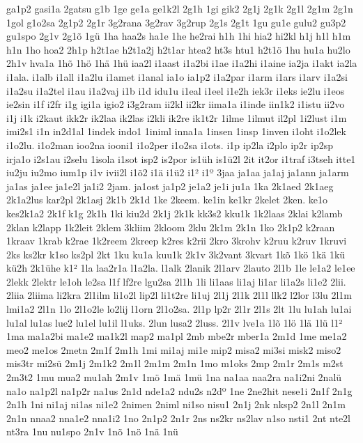 {ga1p2
gasi1a
2gatsu
g1b
1ge
ge1a
ge1k2l
2g1h
1gi
gik2
2g1j
2g1k
2g1l
2g1m
2g1n
1gol
g1o2sa
2g1p2
2g1r
3g2rana
3g2rav
3g2rup
2g1s
2g1t
1gu
gu1e
gulu2
gu3p2
gu1spo
2g1v
2g1^^f5
1g^^fc
1ha
haa2s
ha1e
1he
he2rai
h1h
1hi
hia2
hi2kl
h1j
h1l
h1m
h1n
1ho
hoa2
2h1p
h2t1ae
h2t1a2j
h2t1ar
htea2
ht3s
htu1
h2t1^^f6
1hu
hu1a
hu2lo
2h1v
hva1a
1h^^f5
1h^^f6
1h^^e4
1h^^fc
iaa2l
i1aast
i1a2bi
i1ae
i1a2hi
i1aine
ia2ja
i1akt
ia2la
i1ala.
i1alb
i1all
i1a2lu
i1amet
i1anal
ia1o
ia1p2
i1a2par
i1arm
i1ars
i1arv
i1a2si
i1a2su
i1a2tel
i1au
i1a2vaj
i1b
i1d
idu1u
i1eal
i1eel
i1e2h
iek3r
i1eks
ie2lu
i1eos
ie2sin
i1f
i2fr
i1g
igi1a
igio2
i3g2ram
ii2kl
ii2kr
iima1a
i1inde
iin1k2
i1istu
ii2vo
i1j
i1k
i2kaut
ikk2r
ik2laa
ik2las
i2kli
ik2re
ik1t2r
1ilme
1ilmut
il2pl
1i2lust
i1m
imi2s1
i1n
in2d1al
1indek
indo1
1iniml
inna1a
1insen
1insp
1inven
i1oht
i1o2lek
i1o2lu.
i1o2man
ioo2na
iooni1
i1o2per
i1o2sa
i1ots.
i1p
ip2la
i2plo
ip2r
ip2sp
irja1o
i2s1au
i2selu
1isola
i1sot
isp2
is2por
is1^^fch
is1^^fc2l
2it
it2or
i1traf
i3tseh
itte1
iu2ju
iu2mo
ium1p
i1v
ivii2l
i1^^f52
i1^^e4
i1^^fc2
i1^^b2
i1^^ba
3jaa
ja1aa
ja1aj
ja1ann
ja1arm
ja1as
ja1ee
ja1e2l
ja1i2
2jam.
ja1ost
ja1p2
je1a2
je1i
ju1a
1ka
2k1aed
2k1aeg
2k1a2lus
kar2pl
2k1asj
2k1b
2k1d
1ke
2keem.
ke1in
ke1kr
2kelet
2ken.
ke1o
kes2k1a2
2k1f
k1g
2k1h
1ki
kiu2d
2k1j
2k1k
kk3s2
kku1k
1k2laas
2klai
k2lamb
2klan
k2lapp
1k2leit
2klem
3kliim
2kloom
2klu
2k1m
2k1n
1ko
2k1p2
k2raan
1kraav
1krab
k2rae
1k2reem
2kreep
k2res
k2rii
2kro
3krohv
k2ruu
k2ruv
1kruvi
2ks
ks2kr
k1so
ks2pl
2kt
1ku
ku1a
kuu1k
2k1v
3k2vant
3kvart
1k^^f5
1k^^f6
1k^^e4
1k^^fc
k^^fc2h
2k1^^fche
k1^^b2
1la
laa2r1a
l1a2la.
l1alk
2lanik
2l1arv
2lauto
2l1b
1le
le1a2
le1ee
2lekk
2lektr
le1oh
le2sa
l1f
lf2re
lgu2sa
2l1h
1li
li1aas
li1aj
li1ar
li1a2s
li1e2
2lii.
2liia
2liima
li2kra
2l1ilm
li1o2l
lip2l
li1t2re
li1uj
2l1j
2l1k
2l1l
llk2
l2lor
l3lu
2l1m
lmi1a2
2l1n
1lo
2l1o2le
lo2lij
l1orn
2l1o2sa.
2l1p
lp2r
2l1r
2l1s
2lt
1lu
lu1ah
lu1ai
lu1al
lu1as
lue2
lu1el
lu1il
l1uks.
2lun
lusa2
2luss.
2l1v
lve1a
1l^^f5
1l^^f6
1l^^e4
1l^^fc
l1^^b2
1ma
ma1a2bi
ma1e2
ma1k2l
map2
ma1pl
2mb
mbe2r
mber1a
2m1d
1me
me1a2
meo2
me1os
2metn
2m1f
2m1h
1mi
mi1aj
mi1e
mip2
misa2
mi3si
misk2
miso2
mis3tr
mi2s^^fc
2m1j
2m1k2
2m1l
2m1m
2m1n
1mo
m1oks
2mp
2m1r
2m1s
m2st
2m3t2
1mu
mua2
mu1ah
2m1v
1m^^f6
1m^^e4
1m^^fc
1na
na1aa
naa2ra
na1i2ni
2nal^^fc
na1o
na1p2l
na1p2r
na1us
2n1d
nde1a2
ndu2s
n2d^^ba
1ne
2ne2hit
nese1i
2n1f
2n1g
2n1h
1ni
ni1aj
ni1as
ni1e2
2nimen
2niml
ni1so
nisu1
2n1j
2nk
nksp2
2n1l
2n1m
2n1n
nnaa2
nna1e2
nna1i2
1no
2n1p2
2n1r
2ns
ns2kr
ns2lav
n1so
nsti1
2nt
nte2l
nt3ra
1nu
nu1spo
2n1v
1n^^f5
1n^^f6
1n^^e4
1n^^fc
}
